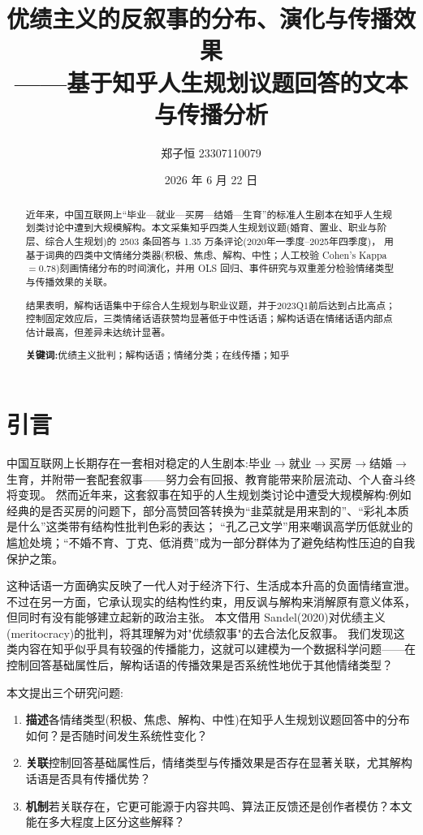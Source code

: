 \documentclass[11pt,a4paper]{ctexart}
\title{\textbf{优绩主义的反叙事的分布、演化与传播效果\\[2pt]
\large ——基于知乎人生规划议题回答的文本与传播分析}}
\author{郑子恒 23307110079}
\date{2026 年 6 月 22 日}
\begin{document}
\maketitle

\begin{abstract}
\noindent
近年来，中国互联网上“毕业—就业—买房—结婚—生育”的标准人生剧本在知乎人生规划类讨论中遭到大规模解构。本文采集知乎四类人生规划议题(婚育、置业、职业与阶层、综合人生规划)的 2503 条回答与 1.35 万条评论(2020年一季度--2025年四季度)，
用基于词典的四类中文情绪分类器(积极、焦虑、解构、中性；人工校验 Cohen's Kappa $=0.78$)刻画情绪分布的时间演化，并用 OLS 回归、事件研究与双重差分检验情绪类型与传播效果的关联。

结果表明，解构话语集中于综合人生规划与职业议题，并于2023Q1前后达到占比高点；控制固定效应后，三类情绪话语获赞均显著低于中性话语；解构话语在情绪话语内部点估计最高，但差异未达统计显著。
\par\medskip
\noindent\textbf{关键词:}优绩主义批判；解构话语；情绪分类；在线传播；知乎
\end{abstract}

\section{引言}

中国互联网上长期存在一套相对稳定的人生剧本:毕业$\rightarrow$就业$\rightarrow$买房$\rightarrow$结婚$\rightarrow$生育，并附带一套配套叙事——努力会有回报、教育能带来阶层流动、个人奋斗终将变现。
然而近年来，这套叙事在知乎的人生规划类讨论中遭受大规模解构:例如经典的是否买房的问题下，部分高赞回答转换为“韭菜就是用来割的”、“彩礼本质是什么”这类带有结构性批判色彩的表达；
“孔乙己文学”用来嘲讽高学历低就业的尴尬处境；“不婚不育、丁克、低消费”成为一部分群体为了避免结构性压迫的自我保护之策。

这种话语一方面确实反映了一代人对于经济下行、生活成本升高的负面情绪宣泄。
不过在另一方面，它承认现实的结构性约束，用反讽与解构来消解原有意义体系，但同时有没有能够建立起新的政治主张。
本文借用 Sandel(2020)对优绩主义(meritocracy)的批判，将其理解为对"优绩叙事"的去合法化反叙事。
我们发现这类内容在知乎似乎具有较强的传播能力，这就可以建模为一个数据科学问题——在控制回答基础属性后，解构话语的传播效果是否系统性地优于其他情绪类型？

本文提出三个研究问题:
\begin{enumerate}[leftmargin=2.4em,itemsep=2pt]
  \item \textbf{描述}各情绪类型(积极、焦虑、解构、中性)在知乎人生规划议题回答中的分布如何？是否随时间发生系统性变化？
  \item \textbf{关联}控制回答基础属性后，情绪类型与传播效果是否存在显著关联，尤其解构话语是否具有传播优势？
  \item \textbf{机制}若关联存在，它更可能源于内容共鸣、算法正反馈还是创作者模仿？本文能在多大程度上区分这些解释？
\end{enumerate}
\end{document}
